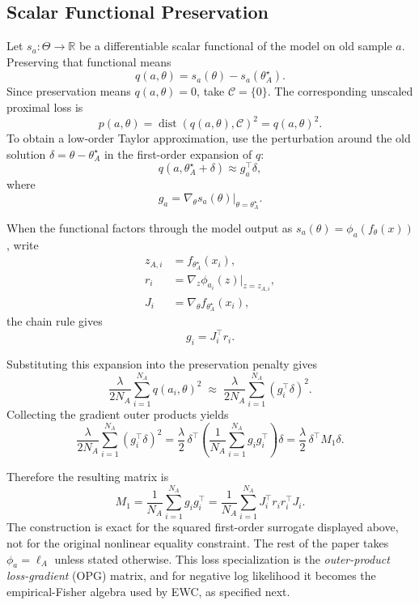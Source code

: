 \subsection{Scalar Functional Preservation}
\label{sec:scalar-functional-preservation}

Let $s_a:\Theta\to\mathbb R$ be a differentiable scalar functional of the model on old sample $a$. Preserving that functional means
\[
q(a,\theta)
=
s_a(\theta)-s_a(\theta_A^\star).
\]
Since preservation means $q(a,\theta)=0$, take $\mathcal C=\{0\}$. The corresponding unscaled proximal loss is
\[
p(a,\theta)
=
\operatorname{dist}(q(a,\theta),\mathcal C)^2
=
q(a,\theta)^2.
\]
To obtain a low-order Taylor approximation, use the perturbation around the old solution $\delta=\theta-\theta_A^\star$ in the first-order expansion of $q$:
\[
q(a,\theta_A^\star+\delta)
\approx
g_a^\top\delta,
\]
where
\[
g_a
=
\nabla_\theta s_a(\theta)\big|_{\theta=\theta_A^\star}.
\]

When the functional factors through the model output as $s_a(\theta)=\phi_a(f_\theta(x))$, write
\[
\begin{aligned}
z_{A,i} &= f_{\theta_A^\star}(x_i),\\
r_i &= \nabla_z \phi_{a_i}(z)\big|_{z=z_{A,i}},\\
J_i &= \nabla_\theta f_{\theta_A^\star}(x_i),
\end{aligned}
\]
the chain rule gives
\[
g_i
=
J_i^\top r_i.
\]

Substituting this expansion into the preservation penalty gives
\[
\frac{\lambda}{2N_A}\sum_{i=1}^{N_A} q(a_i,\theta)^2
\;\approx\;
\frac{\lambda}{2N_A}\sum_{i=1}^{N_A} (g_i^\top\delta)^2.
\]
Collecting the gradient outer products yields
\[
\frac{\lambda}{2N_A}\sum_{i=1}^{N_A} (g_i^\top\delta)^2
=
\frac{\lambda}{2}\,
\delta^\top
\left(
\frac{1}{N_A}\sum_{i=1}^{N_A} g_i g_i^\top
\right)
\delta
=
\frac{\lambda}{2}\,
\delta^\top
M_1
\delta.
\]

Therefore the resulting matrix is
\[
M_1
=
\frac{1}{N_A}\sum_{i=1}^{N_A} g_i g_i^\top
=
\frac{1}{N_A}\sum_{i=1}^{N_A} J_i^\top r_i r_i^\top J_i.
\]
The construction is exact for the squared first-order surrogate displayed above, not for the original nonlinear equality constraint. The rest of the paper takes $\phi_a=\ell_A$ unless stated otherwise. This loss specialization is the \emph{outer-product loss-gradient} (OPG) matrix, and for negative log likelihood it becomes the empirical-Fisher algebra used by EWC, as specified next.

